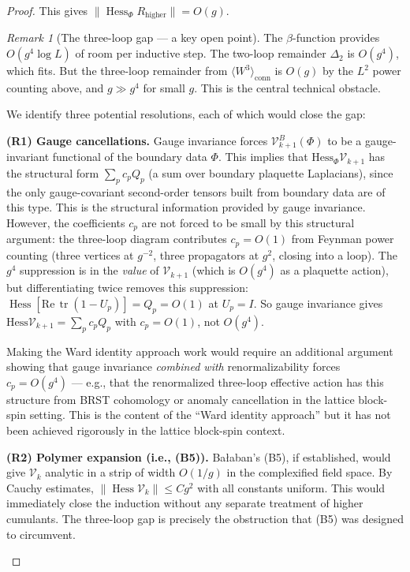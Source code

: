 \documentclass[11pt,a4paper]{article}
\theoremstyle{plain}
\theoremstyle{definition}
\theoremstyle{remark}
\newtheorem{remark}[theorem]{Remark}
\newcommand{\tr}{\operatorname{tr}}
\newcommand{\Hess}{\operatorname{Hess}}
\newcommand{\cV}{\mathcal{V}}
\begin{document}
\begin{proof}
This gives $\|\Hess_\Phi R_{\mathrm{higher}}\| = O(g)$.

\begin{remark}[The three-loop gap --- a key open point]
\label{rem:three_loop_gap}
The $\beta$-function provides $O(g^4\log L)$ of room
per inductive step. The two-loop remainder $\Delta_2$
is $O(g^4)$, which fits. But the three-loop remainder
from $\langle W^3\rangle_{\mathrm{conn}}$ is $O(g)$
by the $L^2$ power counting above, and $g \gg g^4$
for small $g$. This is the central technical obstacle.

We identify three potential resolutions, each of which
would close the gap:

\textbf{(R1) Gauge cancellations.}
Gauge invariance forces $\cV_{k+1}^B(\Phi)$ to be a
gauge-invariant functional of the boundary data $\Phi$.
This implies that $\text{Hess}_\Phi\cV_{k+1}$ has the
structural form $\sum_p c_p Q_p$ (a sum over boundary
plaquette Laplacians), since the only gauge-covariant
second-order tensors built from boundary data are of this
type. This is the structural information provided by
gauge invariance.
However, the coefficients $c_p$ are not forced to be small
by this structural argument: the three-loop diagram
contributes $c_p = O(1)$ from Feynman power counting
(three vertices at $g^{-2}$, three propagators at $g^2$,
closing into a loop). The $g^4$ suppression is in the
\emph{value} of $\cV_{k+1}$ (which is $O(g^4)$ as a
plaquette action), but differentiating twice removes this
suppression: $\Hess[\text{Re}\,\tr(1-U_p)] = Q_p = O(1)$
at $U_p = I$.  So gauge invariance gives $\text{Hess}
\cV_{k+1} = \sum_p c_p Q_p$ with $c_p = O(1)$, not $O(g^4)$.

Making the Ward identity approach work would require an
additional argument showing that gauge invariance
\emph{combined with} renormalizability forces $c_p = O(g^4)$
--- e.g., that the renormalized three-loop effective action
has this structure from BRST cohomology or anomaly
cancellation in the lattice block-spin setting. This is
the content of the ``Ward identity approach'' but it has
not been achieved rigorously in the lattice block-spin
context.

\textbf{(R2) Polymer expansion (i.e., (B5)).}
Ba{\l}aban's (B5), if established, would give
$\cV_k$ analytic in a strip of width $O(1/g)$ in the
complexified field space. By Cauchy estimates,
$\|\Hess\cV_k\| \le C g^2$ with all constants uniform.
This would immediately close the induction without
any separate treatment of higher cumulants. The
three-loop gap is precisely the obstruction that
(B5) was designed to circumvent.


\end{remark}
\end{proof}
\end{document}
